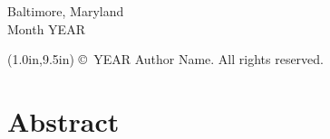 \documentclass[12pt,letterpaper]{article}   %
\def\GlobalMargin{1.0in}
\def\MainTextSpacing{\singlespacing}        %
\def\TOCTextSpacing{\singlespacing}         %
\numberwithin{equation}{section}        %
\begin{document}

\vspace{0.75in}                     %



\begin{center}
    Baltimore, Maryland \\          %
    Month YEAR                      %
    
    {\begin{textblock*}{\textwidth}(\GlobalMargin,9.5in)
        \copyright\ YEAR Author Name. All rights reserved.
    \end{textblock*}
    \null}
\end{center}







\clearpage 
{}
\setcounter{page}{2}
\MainTextSpacing
{}
\section*{Abstract}

\blindtext




\clearpage
{}
\TOCTextSpacing                         %
\hypersetup{linkcolor=black}            %


\renewcommand{\contentsname}{Table of Contents \vspace{3.6pt} \hrule}
\tableofcontents


\clearpage {}
\renewcommand{\listtablename}{List of Tables \vspace{3.6pt} \hrule}
\listoftables
\clearpage
\end{document}
